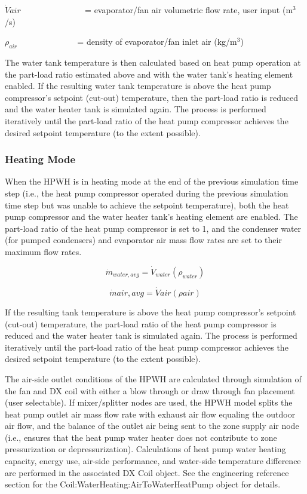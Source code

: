 \(\dot Vair\) ~~~~~~~~~~~~~~ = evaporator/fan air volumetric flow rate, user input (m\(^{3}\)/s)

\({\rho_{air}}\) ~~~~~~~~~~~~~ = density of evaporator/fan inlet air (kg/m\(^{3}\))

The water tank temperature is then calculated based on heat pump operation at the part-load ratio estimated above and with the water tank's heating element enabled. If the resulting water tank temperature is above the heat pump compressor's setpoint (cut-out) temperature, then the part-load ratio is reduced and the water heater tank is simulated again. The process is performed iteratively until the part-load ratio of the heat pump compressor achieves the desired setpoint temperature (to the extent possible).

\subsubsection{Heating Mode}\label{heating-mode-000}

When the HPWH is in heating mode at the end of the previous simulation time step (i.e., the heat pump compressor operated during the previous simulation time step but was unable to achieve the setpoint temperature), both the heat pump compressor and the water heater tank's heating element are enabled. The part-load ratio of the heat pump compressor is set to 1, and the condenser water (for pumped condensers) and evaporator air mass flow rates are set to their maximum flow rates.

\begin{equation}
{\dot m_{water,avg}} = {\dot V_{water}}\left( {{\rho_{water}}} \right)
\end{equation}

\begin{equation}
\dot mair,avg = \dot Vair\left( {\rho air} \right)
\end{equation}

If the resulting tank temperature is above the heat pump compressor's setpoint (cut-out) temperature, the part-load ratio of the heat pump compressor is reduced and the water heater tank is simulated again. The process is performed iteratively until the part-load ratio of the heat pump compressor achieves the desired setpoint temperature (to the extent possible).

The air-side outlet conditions of the HPWH are calculated through simulation of the fan and DX coil with either a blow through or draw through fan placement (user selectable). If mixer/splitter nodes are used, the HPWH model splits the heat pump outlet air mass flow rate with exhaust air flow equaling the outdoor air flow, and the balance of the outlet air being sent to the zone supply air node (i.e., ensures that the heat pump water heater does not contribute to zone pressurization or depressurization). Calculations of heat pump water heating capacity, energy use, air-side performance, and water-side temperature difference are performed in the associated DX Coil object. See the engineering reference section for the Coil:WaterHeating:AirToWaterHeatPump object for details.

